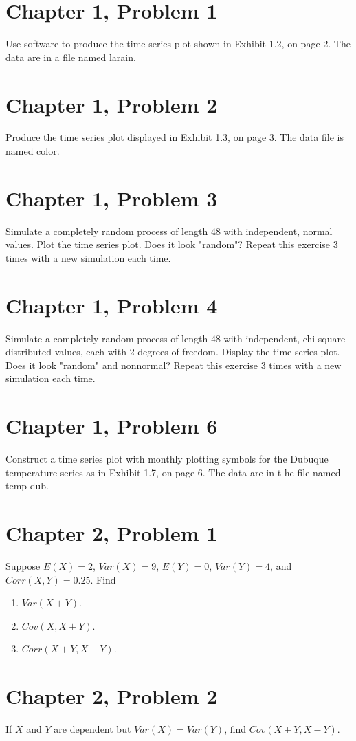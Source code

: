 \documentclass[11pt]{article}
\newif\ifclearpage
\newcommand{\problem}[1]{\section*{#1}}
\newcommand{\solution}{\hrulefill}
\newcommand{\maybeclearpage}{\ifclearpage\clearpage\fi}
\begin{document}
\problem{Chapter 1, Problem 1}
Use software to produce the time series plot shown in Exhibit 1.2, on page 2.  The data are in a file named larain.

\solution


\maybeclearpage
\problem{Chapter 1, Problem 2}
Produce the time series plot displayed in Exhibit 1.3, on page 3. The data file is named color.

\solution



\maybeclearpage
\problem{Chapter 1, Problem 3}
Simulate a completely random process of length 48 with independent, normal values. Plot the time series plot. Does it look "random"? Repeat this exercise 3 times with a new simulation each time.

\solution


\maybeclearpage
\problem{Chapter 1, Problem 4}
Simulate a completely random process of length 48 with independent, chi-square distributed values, each with 2 degrees of freedom. Display the time series plot. Does it look "random" and nonnormal? Repeat this exercise 3 times with a new simulation each time.

\solution


\maybeclearpage
\problem{Chapter 1, Problem 6}
Construct a time series plot with monthly plotting symbols for the Dubuque temperature series as in Exhibit 1.7, on page 6. The data are in t he file named temp-dub. 

\solution


\maybeclearpage
\problem{Chapter 2, Problem 1}
Suppose $E(X) = 2$, $Var(X) = 9$, $E(Y) = 0$, $Var(Y) = 4$, and $Corr(X,Y) = 0.25$.  Find
\begin{enumerate}
	\item $Var(X+Y)$.
	\item $Cov(X,X+Y)$.
	\item $Corr(X+Y,X-Y)$.
\end{enumerate}
\solution


\maybeclearpage
\problem{Chapter 2, Problem 2}
If $X$ and $Y$ are dependent but $Var(X) = Var(Y)$, find $Cov(X+Y,X-Y)$.

\solution


\maybeclearpage
\end{document}
